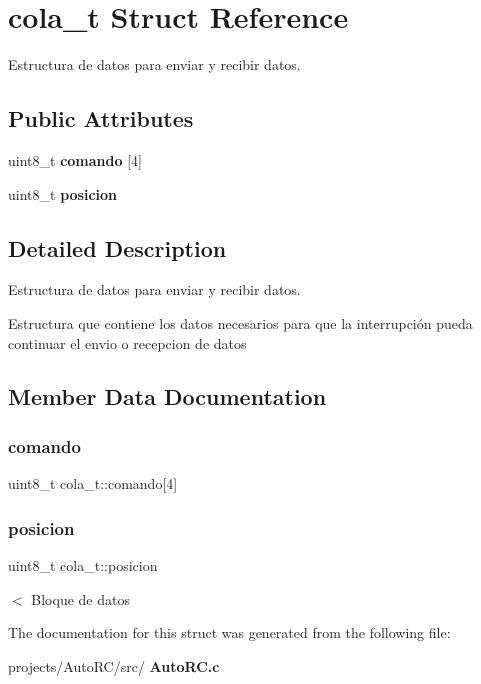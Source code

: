 \section{cola\+\_\+t Struct Reference}
\label{structcola__t}


Estructura de datos para enviar y recibir datos.  


\subsection*{Public Attributes}
\begin{DoxyCompactItemize}
\item 
uint8\+\_\+t \textbf{ comando} [4]
\item 
uint8\+\_\+t \textbf{ posicion}
\end{DoxyCompactItemize}


\subsection{Detailed Description}
Estructura de datos para enviar y recibir datos. 

Estructura que contiene los datos necesarios para que la interrupción pueda continuar el envio o recepcion de datos 

\subsection{Member Data Documentation}
\mbox{\label{structcola__t_ae774284287a701581b1d1adb3568a486}} 
\subsubsection{comando}
{\footnotesize\ttfamily uint8\+\_\+t cola\+\_\+t\+::comando[4]}

\mbox{\label{structcola__t_a4cd313f7ae6699604cb45d771d3c6786}} 
\subsubsection{posicion}
{\footnotesize\ttfamily uint8\+\_\+t cola\+\_\+t\+::posicion}

$<$ Bloque de datos 

The documentation for this struct was generated from the following file\+:\begin{DoxyCompactItemize}
\item 
projects/\+Auto\+R\+C/src/\textbf{ Auto\+R\+C.\+c}\end{DoxyCompactItemize}
